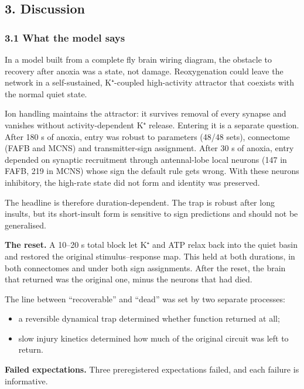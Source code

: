 \documentclass[11pt]{article}
\providecommand{\tightlist}{\setlength{\itemsep}{0pt}\setlength{\parskip}{0pt}}
\begin{document}
\subsection{3. Discussion}\label{discussion}

\subsubsection{3.1 What the model says}\label{what-the-model-says}

In a model built from a complete fly brain wiring diagram, the obstacle to recovery after anoxia was a state, not damage. Reoxygenation could leave the network in a self-sustained, K⁺-coupled high-activity attractor that coexists with the normal quiet state.

Ion handling maintains the attractor: it survives removal of every synapse and vanishes without activity-dependent K⁺ release. Entering it is a separate question. After 180 s of anoxia, entry was robust to parameters (48/48 sets), connectome (FAFB and MCNS) and transmitter-sign assignment. After 30 s of anoxia, entry depended on synaptic recruitment through antennal-lobe local neurons (147 in FAFB, 219 in MCNS) whose sign the default rule gets wrong. With these neurons inhibitory, the high-rate state did not form and identity was preserved.

The headline is therefore duration-dependent. The trap is robust after long insults, but its short-insult form is sensitive to sign predictions and should not be generalised.

\textbf{The reset.} A 10--20 s total block let K⁺ and ATP relax back into the quiet basin and restored the original stimulus--response map. This held at both durations, in both connectomes and under both sign assignments. After the reset, the brain that returned was the original one, minus the neurons that had died.

The line between ``recoverable'' and ``dead'' was set by two separate processes:

\begin{itemize}
\tightlist
\item
  a reversible dynamical trap determined whether function returned at all;
\item
  slow injury kinetics determined how much of the original circuit was left to return.
\end{itemize}

\textbf{Failed expectations.} Three preregistered expectations failed, and each failure is informative.
\end{document}
